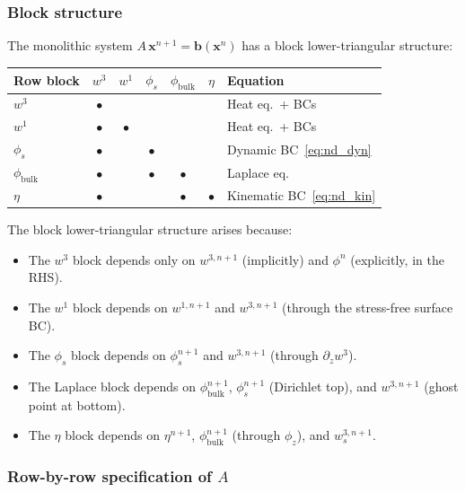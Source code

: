 \documentclass{article}
\newcommand{\xx}{\mathbf{x}}
\newcommand{\bb}{\mathbf{b}}
\begin{document}
\subsubsection{Block structure}

The monolithic system $A\,\xx^{n+1} = \bb(\xx^n)$ has a block lower-triangular structure:

\begin{center}
\begin{tabular}{lcccccl}
\toprule
Row block & $w^3$ & $w^1$ & $\phi_s$ & $\phi_{\mathrm{bulk}}$ & $\eta$ & Equation \\
\midrule
$w^3$             & $\bullet$ &           &             &                &        & Heat eq.\ + BCs \\
$w^1$             & $\bullet$ & $\bullet$ &             &                &        & Heat eq.\ + BCs \\
$\phi_s$          & $\bullet$ &           & $\bullet$   &                &        & Dynamic BC~\eqref{eq:nd_dyn} \\
$\phi_{\mathrm{bulk}}$ & $\bullet$ &     & $\bullet$   & $\bullet$      &        & Laplace eq. \\
$\eta$            & $\bullet$ &           &             & $\bullet$      & $\bullet$ & Kinematic BC~\eqref{eq:nd_kin} \\
\bottomrule
\end{tabular}
\end{center}

The block lower-triangular structure arises because:
\begin{itemize}
    \item The $w^3$ block depends only on $w^{3,n+1}$ (implicitly) and $\phi^n$ (explicitly, in the RHS).
    \item The $w^1$ block depends on $w^{1,n+1}$ and $w^{3,n+1}$ (through the stress-free surface BC).
    \item The $\phi_s$ block depends on $\phi_s^{n+1}$ and $w^{3,n+1}$ (through $\partial_z w^3$).
    \item The Laplace block depends on $\phi_{\mathrm{bulk}}^{n+1}$, $\phi_s^{n+1}$ (Dirichlet top), and $w^{3,n+1}$ (ghost point at bottom).
    \item The $\eta$ block depends on $\eta^{n+1}$, $\phi_{\mathrm{bulk}}^{n+1}$ (through $\phi_z$), and $w^{3,n+1}_s$.
\end{itemize}

\color{blue}
\subsubsection{Row-by-row specification of \texorpdfstring{$A$}{A}}
\label{sec:row_by_row}
\end{document}
